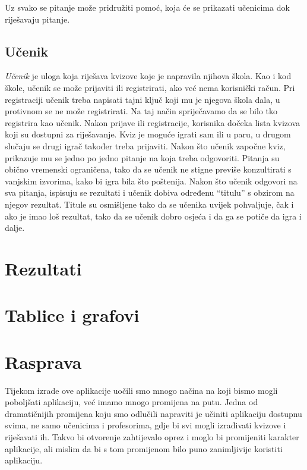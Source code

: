 \documentclass{scrreprt}
\begin{document}
Uz svako se pitanje može pridružiti pomoć, koja će se prikazati učenicima dok
riješavaju pitanje.

\section{Učenik}

\emph{Učenik} je uloga koja riješava kvizove koje je napravila njihova škola.
Kao i kod škole, učenik se može prijaviti ili registrirati, ako već nema
korisnički račun. Pri registraciji učenik treba napisati tajni ključ koji mu je
njegova škola dala, u protivnom se ne može registrirati. Na taj način
spriječavamo da se bilo tko registrira kao učenik. Nakon prijave ili
registracije, korisnika dočeka lista kvizova koji su dostupni za riješavanje.
Kviz je moguće igrati sam ili u paru, u drugom slučaju se drugi igrač također
treba prijaviti. Nakon što učenik započne kviz, prikazuje mu se jedno po jedno
pitanje na koja treba odgovoriti. Pitanja su obično vremenski ograničena, tako
da se učenik ne stigne previše konzultirati s vanjskim izvorima, kako bi igra
bila što poštenija. Nakon što učenik odgovori na sva pitanja, ispisuju se
rezultati i učenik dobiva određenu ``titulu'' s obzirom na njegov rezultat.
Titule su osmišljene tako da se učenika uvijek pohvaljuje, čak i ako je imao loš
rezultat, tako da se učenik dobro osjeća i da ga se potiče da igra i dalje.

\chapter{Rezultati}

\chapter{Tablice i grafovi}

\chapter{Rasprava}

Tijekom izrade ove aplikacije uočili smo mnogo načina na koji bismo mogli
poboljšati aplikaciju, već imamo mnogo promijena na putu. Jedna od dramatičnijih
promijena koju smo odlučili napraviti je učiniti aplikaciju dostupnu svima, ne
samo učenicima i profesorima, gdje bi svi mogli izrađivati kvizove i riješavati
ih. Takvo bi otvorenje zahtijevalo oprez i moglo bi promijeniti karakter
aplikacije, ali mislim da bi s tom promijenom bilo puno zanimljivije koristiti
aplikaciju.
\end{document}
